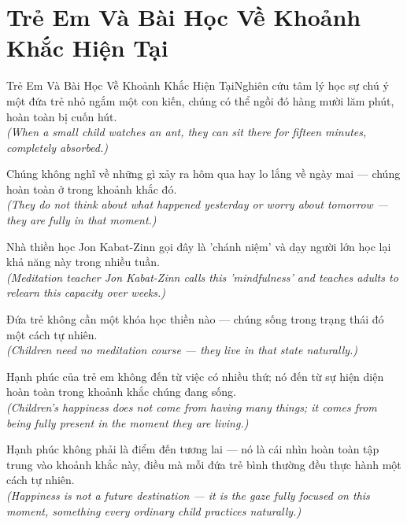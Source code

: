 \section{Trẻ Em Và Bài Học Về Khoảnh Khắc Hiện Tại}
\begin{truyen}{Trẻ Em Và Bài Học Về Khoảnh Khắc Hiện Tại}{Nghiên cứu tâm lý học sự chú ý}
 một đứa trẻ nhỏ ngắm một con kiến, chúng có thể ngồi đó hàng mười lăm phút, hoàn toàn bị cuốn hút.\\[4pt]
\textit{(When a small child watches an ant, they can sit there for fifteen minutes, completely absorbed.)}

Chúng không nghĩ về những gì xảy ra hôm qua hay lo lắng về ngày mai --- chúng hoàn toàn ở trong khoảnh khắc đó.\\[4pt]
\textit{(They do not think about what happened yesterday or worry about tomorrow --- they are fully in that moment.)}

Nhà thiền học Jon Kabat-Zinn gọi đây là 'chánh niệm' và dạy người lớn học lại khả năng này trong nhiều tuần.\\[4pt]
\textit{(Meditation teacher Jon Kabat-Zinn calls this 'mindfulness' and teaches adults to relearn this capacity over weeks.)}

Đứa trẻ không cần một khóa học thiền nào --- chúng sống trong trạng thái đó một cách tự nhiên.\\[4pt]
\textit{(Children need no meditation course --- they live in that state naturally.)}

Hạnh phúc của trẻ em không đến từ việc có nhiều thứ; nó đến từ sự hiện diện hoàn toàn trong khoảnh khắc chúng đang sống.\\[4pt]
\textit{(Children's happiness does not come from having many things; it comes from being fully present in the moment they are living.)}

\end{truyen}
\begin{baihoc}
  Hạnh phúc không phải là điểm đến tương lai --- nó là cái nhìn hoàn toàn tập trung vào khoảnh khắc này, điều mà mỗi đứa trẻ bình thường đều thực hành một cách tự nhiên.\\[4pt]
  \textit{(Happiness is not a future destination --- it is the gaze fully focused on this moment, something every ordinary child practices naturally.)}
\end{baihoc}

